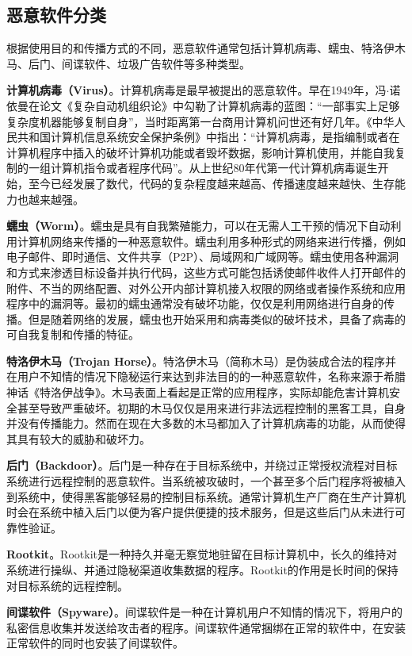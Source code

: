 \subsection{恶意软件分类}
根据使用目的和传播方式的不同，恶意软件通常包括计算机病毒、蠕虫、特洛伊木马、后门、间谍软件、垃圾广告软件等多种类型。
\begin{asparaenum}
\item \textbf{计算机病毒（Virus）}。计算机病毒是最早被提出的恶意软件。早在1949年，冯$\cdot$诺依曼在论文《复杂自动机组织论》\cite{Neumann1966Theory}中勾勒了计算机病毒的蓝图：``一部事实上足够复杂度机器能够复制自身''，当时距离第一台商用计算机问世还有好几年。《中华人民共和国计算机信息系统安全保护条例》中指出：``计算机病毒，是指编制或者在计算机程序中插入的破坏计算机功能或者毁坏数据，影响计算机使用，并能自我复制的一组计算机指令或者程序代码''\cite{gov1994Standard}。从上世纪80年代第一代计算机病毒诞生开始，至今已经发展了数代，代码的复杂程度越来越高、传播速度越来越快、生存能力也越来越强。
\item \textbf{蠕虫（Worm）}。蠕虫是具有自我繁殖能力，可以在无需人工干预的情况下自动利用计算机网络来传播的一种恶意软件\cite{skoudis2004malware}。蠕虫利用多种形式的网络来进行传播，例如电子邮件、即时通信、文件共享（P2P）、局域网和广域网等。蠕虫使用各种漏洞和方式来渗透目标设备并执行代码，这些方式可能包括诱使邮件收件人打开邮件的附件、不当的网络配置、对外公开内部计算机接入权限的网络或者操作系统和应用程序中的漏洞等。最初的蠕虫通常没有破坏功能，仅仅是利用网络进行自身的传播。但是随着网络的发展，蠕虫也开始采用和病毒类似的破坏技术，具备了病毒的可自我复制和传播的特征。
\item \textbf{特洛伊木马（Trojan Horse）}。特洛伊木马（简称木马）是伪装成合法的程序并在用户不知情的情况下隐秘运行来达到非法目的的一种恶意软件，名称来源于希腊神话《特洛伊战争》\cite{trojanhorseWiki}。木马表面上看起是正常的应用程序，实际却能危害计算机安全甚至导致严重破坏。初期的木马仅仅是用来进行非法远程控制的黑客工具，自身并没有传播能力。然而在现在大多数的木马都加入了计算机病毒的功能，从而使得其具有较大的威胁和破坏力。
\item \textbf{后门（Backdoor）}。后门是一种存在于目标系统中，并绕过正常授权流程对目标系统进行远程控制的恶意软件\cite{skoudis2004malware}。当系统被攻破时，一个甚至多个后门程序将被植入到系统中，使得黑客能够轻易的控制目标系统。通常计算机生产厂商在生产计算机时会在系统中植入后门以便为客户提供便捷的技术服务，但是这些后门从未进行可靠性验证。
\item \textbf{Rootkit}。Rootkit是一种持久并毫无察觉地驻留在目标计算机中，长久的维持对系统进行操纵、并通过隐秘渠道收集数据的程序。Rootkit的作用是长时间的保持对目标系统的远程控制。
\item \textbf{间谍软件（Spyware）}。间谍软件是一种在计算机用户不知情的情况下，将用户的私密信息收集并发送给攻击者的程序。间谍软件通常捆绑在正常的软件中，在安装正常软件的同时也安装了间谍软件。
\end{asparaenum}

